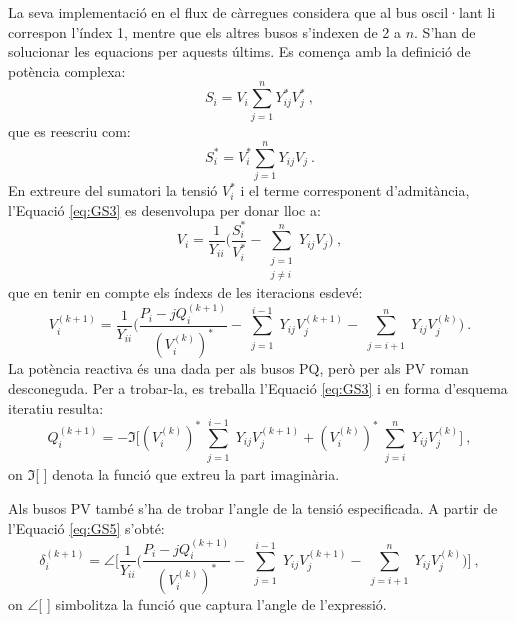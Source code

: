 La seva implementació en el flux de càrregues considera que al bus oscil·lant li correspon l'índex 1, mentre que els altres busos s'indexen de 2 a $n$. S'han de solucionar les equacions per aquests últims. Es comença amb la definició de potència complexa:
\begin{equation}
    S_i=V_i\sum_{j=1}^{n}Y^*_{ij}V^*_j\ ,
    \label{eq:GS2}
\end{equation}
que es reescriu com:
\begin{equation}
    S^*_i=V^*_i\sum_{j=1}^{n}Y_{ij}V_j\ .
    \label{eq:GS3}
\end{equation}
En extreure del sumatori la tensió $V^*_i$ i el terme corresponent d'admitància, l'Equació \ref{eq:GS3} es desenvolupa per donar lloc a:
\begin{equation}
    V_i=\frac{1}{Y_{ii}}\biggl(\frac{S^*_i}{V^*_i}-\sum_{\substack{j=1 \\ j\neq i}}^n Y_{ij}V_j \biggr)\ ,
    \label{eq:GS4}
\end{equation}
que en tenir en compte els índexs de les iteracions esdevé:
\begin{equation}
    V^{(k+1)}_i=\frac{1}{Y_{ii}}\biggl(\frac{P_i-jQ^{(k+1)}_i}{(V^{(k)}_i)^*}-\sum_{\substack{j=1}}^{i-1} Y_{ij}V^{(k+1)}_j -\sum_{\substack{j=i+1}}^n Y_{ij}V^{(k)}_j \biggr)\ .
    \label{eq:GS5}
\end{equation}
La potència reactiva és una dada per als busos PQ, però per als PV roman desconeguda. Per a trobar-la, es treballa l'Equació \ref{eq:GS3} i en forma d'esquema iteratiu resulta:
\begin{equation}
    Q^{(k+1)}_i=-\Im\biggl[(V^{(k)}_i)^*\sum_{\substack{j=1}}^{i-1} Y_{ij}V^{(k+1)}_j + (V^{(k)}_i)^*\sum_{\substack{j=i}}^{n} Y_{ij}V^{(k)}_j\biggr]\ ,
    \label{eq:GS6}
\end{equation}
on $\Im$[ ] denota la funció que extreu la part imaginària. 

Als busos PV també s'ha de trobar l'angle de la tensió especificada. A partir de l'Equació \ref{eq:GS5} s'obté:
\begin{equation}
    \delta^{(k+1)}_i=\angle\biggl[\frac{1}{Y_{ii}}\biggl(\frac{P_i-jQ^{(k+1)}_i}{(V^{(k)}_i)^*}-\sum_{\substack{j=1}}^{i-1} Y_{ij}V^{(k+1)}_j -\sum_{\substack{j=i+1}}^n Y_{ij}V^{(k)}_j \biggr)\biggr]\ ,
    \label{eq:GS7}
\end{equation}
on $\angle$[ ] simbolitza la funció que captura l'angle de l'expressió.


